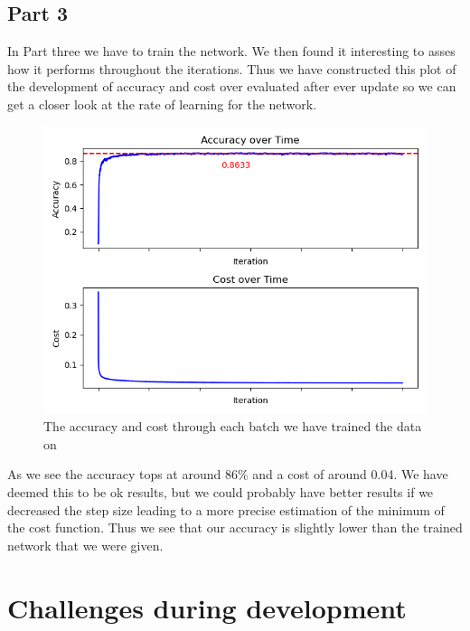 \documentclass[a4paper,oneside,article,english]{memoir}
\begin{document}
\subsection{Part 3}
In Part three we have to train the network. We then found it interesting to asses how it performs throughout the iterations. Thus we have constructed this plot of the development of accuracy and cost over evaluated after ever update so we can get a closer look at the rate of learning for the network.

\begin{figure}
  \centering
  \includegraphics[scale = 0.9]{cost_accuracy_with_line.png}
  \caption{The accuracy and cost through each batch we have trained the data on}
  \label{fig:cost-accuracy}
\end{figure}

As we see the accuracy tops at around $86\%$ and a cost of around 0.04. We have deemed this to be ok results, but we could probably have better results if we decreased the step size leading to a more precise estimation of the minimum of the cost function. Thus we see that our accuracy is slightly lower than the trained network that we were given.


\section{Challenges during development}  
\label{sec:challenges_during_development}
\end{document}
